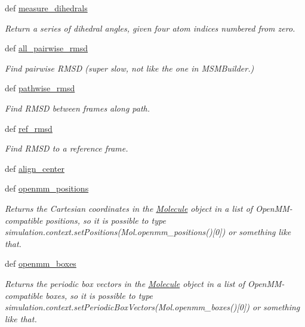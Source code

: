 \begin{DoxyCompactItemize}
def \hyperlink{classforcebalance_1_1molecule_1_1Molecule_aa6b0a08a6579f697667c83e04927298c}{measure\-\_\-dihedrals}
\begin{DoxyCompactList}\small\item\em Return a series of dihedral angles, given four atom indices numbered from zero. \end{DoxyCompactList}\item 
def \hyperlink{classforcebalance_1_1molecule_1_1Molecule_af412b655371674434ec63b4bfea6d8c0}{all\-\_\-pairwise\-\_\-rmsd}
\begin{DoxyCompactList}\small\item\em Find pairwise R\-M\-S\-D (super slow, not like the one in M\-S\-M\-Builder.) \end{DoxyCompactList}\item 
def \hyperlink{classforcebalance_1_1molecule_1_1Molecule_ac0fd89e640485f7216183f9a7601c51f}{pathwise\-\_\-rmsd}
\begin{DoxyCompactList}\small\item\em Find R\-M\-S\-D between frames along path. \end{DoxyCompactList}\item 
def \hyperlink{classforcebalance_1_1molecule_1_1Molecule_a58191a79257fbad7f2c636239bfa7596}{ref\-\_\-rmsd}
\begin{DoxyCompactList}\small\item\em Find R\-M\-S\-D to a reference frame. \end{DoxyCompactList}\item 
def \hyperlink{classforcebalance_1_1molecule_1_1Molecule_aff7a0e2413297088a5bc3e91e5951f3f}{align\-\_\-center}
\item 
def \hyperlink{classforcebalance_1_1molecule_1_1Molecule_a57edc8d72f7e4c1a1452de7b438f3c55}{openmm\-\_\-positions}
\begin{DoxyCompactList}\small\item\em Returns the Cartesian coordinates in the \hyperlink{classforcebalance_1_1molecule_1_1Molecule}{Molecule} object in a list of Open\-M\-M-\/compatible positions, so it is possible to type simulation.\-context.\-set\-Positions(Mol.\-openmm\-\_\-positions()\mbox{[}0\mbox{]}) or something like that. \end{DoxyCompactList}\item 
def \hyperlink{classforcebalance_1_1molecule_1_1Molecule_aa20a420f4b450bfa9e632fae037ecb01}{openmm\-\_\-boxes}
\begin{DoxyCompactList}\small\item\em Returns the periodic box vectors in the \hyperlink{classforcebalance_1_1molecule_1_1Molecule}{Molecule} object in a list of Open\-M\-M-\/compatible boxes, so it is possible to type simulation.\-context.\-set\-Periodic\-Box\-Vectors(Mol.\-openmm\-\_\-boxes()\mbox{[}0\mbox{]}) or something like that. \end{DoxyCompactList}\item 

\end{DoxyCompactItemize}
